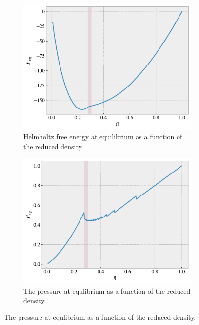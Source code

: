 \documentclass[reprint, amsmath, amssymb, aps, onecolumn]{revtex4-2}
\begin{document}
\begin{figure}[H]
     \centering
     \begin{subfigure}[b]{0.49\textwidth}
         \centering
         \includegraphics[width=\textwidth]{figures/Feq.pdf}
         \caption{Helmholtz free energy at equilibrium as a function of the reduced density.}
         \label{fig:Feq}
     \end{subfigure}
     \hfill
     \centering
     \begin{subfigure}[b]{0.49\textwidth}
         \centering
         \includegraphics[width=\textwidth]{figures/Peq.pdf}
         \caption{The pressure at equlibrium as a function of the reduced density.}
         \label{fig:Peq}
     \end{subfigure}

\end{figure}
\end{document}
